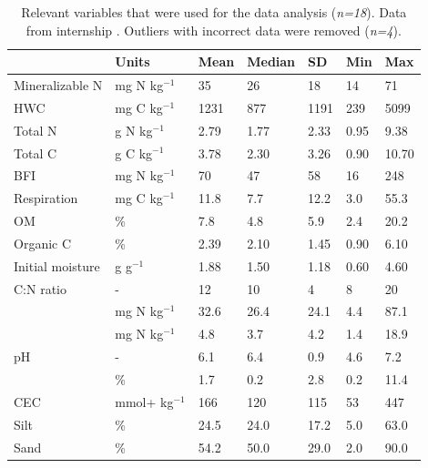 \documentclass[10pt,twoside,dutch,english]{report}
\begin{document}
	\begin{table}[h] %
	\caption{Relevant variables that were used for the data analysis (\textit{n=18}). Data from internship \cite{Echeverri2014}. Outliers with incorrect data were removed (\textit{n=4}).}
	\footnotesize 
	\renewcommand{\arraystretch}{1.2}
			\begin{tabu} to \textwidth{X[1.5,l]X[1.5,l]X[1,r]X[1,r]X[1,r]X[1,r]X[1,r]}
			\toprule \rowfont{\bfseries}
			& Units & Mean & Median & SD & Min & Max \\ \midrule \rowfont{\bfseries}
		Mineralizable N & mg N kg$ ^{-1} $ & 35 & 26 & 18 & 14 & 71 \\  
		HWC & mg C kg$ ^{-1} $ & 1231& 877 & 1191 & 239 & 5099 \\ 
		Total N & g N kg$ ^{-1} $ & 2.79 & 1.77 & 2.33 & 0.95 & 9.38 \\ 
		Total C & g C kg$ ^{-1} $ & 3.78 & 2.30 & 3.26 & 0.90 & 10.70 \\ 
		BFI & mg N kg$ ^{-1} $ & 70 & 47 & 58 & 16 & 248 \\ 
		Respiration & mg C kg$ ^{-1} $  & 11.8 & 7.7 & 12.2 & 3.0 & 55.3 \\ 
		OM & \% & 7.8 & 4.8 & 5.9 & 2.4 & 20.2 \\ 
		Organic C & \% & 2.39 & 2.10 & 1.45 & 0.90 & 6.10 \\ 
		Initial moisture & g  g$ ^{-1}$ & 1.88 & 1.50 & 1.18 & 0.60 & 4.60 \\ 
		C:N ratio & -  & 12 & 10 & 4 & 8 & 20 \\ 
		 & mg N kg$ ^{-1} $ & 32.6 & 26.4 & 24.1 & 4.4 & 87.1 \\ 
		 & mg N kg$ ^{-1} $ & 4.8 & 3.7 & 4.2 & 1.4 & 18.9 \\ 	
		pH & - & 6.1 & 6.4 & 0.9 & 4.6 & 7.2 \\ 
		 & \% & 1.7 & 0.2 & 2.8 & 0.2 & 11.4 \\ 
		CEC & mmol+ kg$ ^{-1} $ & 166 & 120 & 115 & 53 & 447 \\ 
		Silt & \% & 24.5 & 24.0 & 17.2 & 5.0 & 63.0 \\ 
		Sand & \% & 54.2 & 50.0 & 29.0 & 2.0 & 90.0 \\ 
 			 \bottomrule
			
	\end{tabu}
	\label{tab: resuls_char}
\end{table}
\end{document}
